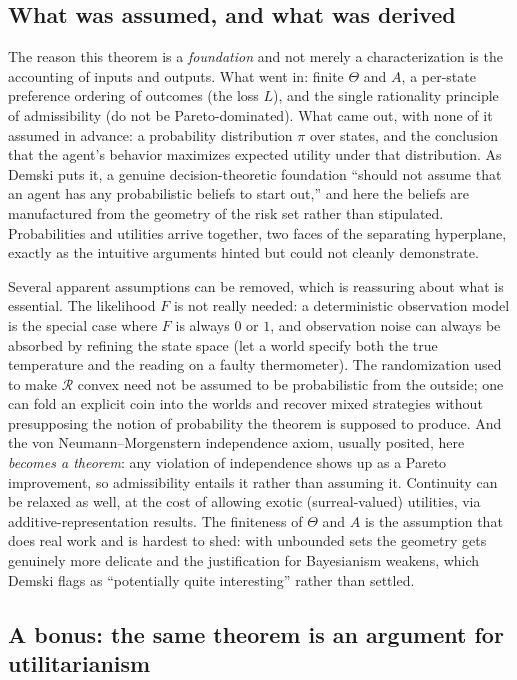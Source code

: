 \documentclass[10pt]{article}
\theoremstyle{definition}
\theoremstyle{remark}
\begin{document}
\subsection{What was assumed, and what was derived}

The reason this theorem is a \emph{foundation} and not merely a characterization is the accounting of inputs and outputs. What went in: finite $\Theta$ and $A$, a per-state preference ordering of outcomes (the loss $L$), and the single rationality principle of admissibility (do not be Pareto-dominated). What came out, with none of it assumed in advance: a probability distribution $\pi$ over states, and the conclusion that the agent's behavior maximizes expected utility under that distribution. As Demski puts it, a genuine decision-theoretic foundation ``should not assume that an agent has any probabilistic beliefs to start out,'' and here the beliefs are manufactured from the geometry of the risk set rather than stipulated. Probabilities and utilities arrive together, two faces of the separating hyperplane, exactly as the intuitive arguments hinted but could not cleanly demonstrate.

Several apparent assumptions can be removed, which is reassuring about what is essential. The likelihood $F$ is not really needed: a deterministic observation model is the special case where $F$ is always $0$ or $1$, and observation noise can always be absorbed by refining the state space (let a world specify both the true temperature and the reading on a faulty thermometer). The randomization used to make $\mathcal{R}$ convex need not be assumed to be probabilistic from the outside; one can fold an explicit coin into the worlds and recover mixed strategies without presupposing the notion of probability the theorem is supposed to produce. And the von Neumann--Morgenstern independence axiom, usually posited, here \emph{becomes a theorem}: any violation of independence shows up as a Pareto improvement, so admissibility entails it rather than assuming it. Continuity can be relaxed as well, at the cost of allowing exotic (surreal-valued) utilities, via additive-representation results. The finiteness of $\Theta$ and $A$ is the assumption that does real work and is hardest to shed: with unbounded sets the geometry gets genuinely more delicate and the justification for Bayesianism weakens, which Demski flags as ``potentially quite interesting'' rather than settled.

\subsection{A bonus: the same theorem is an argument for utilitarianism}
\end{document}
